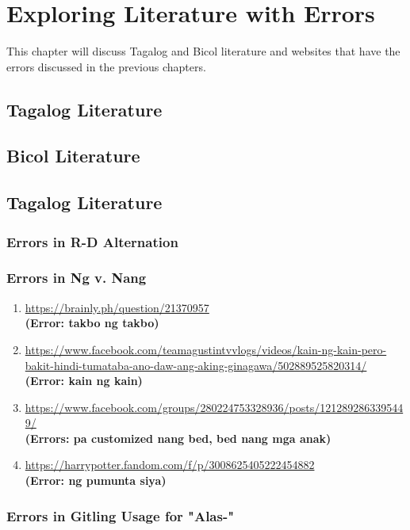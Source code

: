 \chapter{Exploring Literature with Errors}

This chapter will discuss Tagalog and Bicol literature and websites that have the errors discussed in the previous chapters.

\section{Tagalog Literature}

\section{Bicol Literature}


\section{Tagalog Literature}
\subsection{Errors in R-D Alternation}
\subsection{Errors in Ng v. Nang}

\begin{enumerate}
    \item \url{https://brainly.ph/question/21370957} \\
    \textbf{(Error: takbo ng takbo)}
    \item \url{https://www.facebook.com/teamagustintvvlogs/videos/kain-ng-kain-pero-bakit-hindi-tumataba-ano-daw-ang-aking-ginagawa/502889525820314/} \\
    \textbf{(Error: kain ng kain)}
    \item \url{https://www.facebook.com/groups/280224753328936/posts/1212892863395449/} \\
    \textbf{(Errors: pa customized nang bed, bed nang mga anak)}
    \item \url{https://harrypotter.fandom.com/f/p/3008625405222454882} \\
    \textbf{(Error: ng pumunta siya)}
\end{enumerate}

\subsection{Errors in Gitling Usage for "Alas-"}

